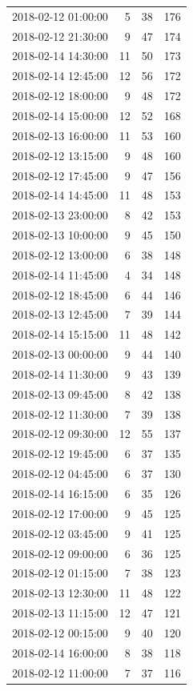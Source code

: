 \begin{tabular}{lrrr}
2018-02-12 01:00:00 & 5 & 38 & 176 \\
2018-02-12 21:30:00 & 9 & 47 & 174 \\
2018-02-14 14:30:00 & 11 & 50 & 173 \\
2018-02-14 12:45:00 & 12 & 56 & 172 \\
2018-02-12 18:00:00 & 9 & 48 & 172 \\
2018-02-14 15:00:00 & 12 & 52 & 168 \\
2018-02-13 16:00:00 & 11 & 53 & 160 \\
2018-02-12 13:15:00 & 9 & 48 & 160 \\
2018-02-12 17:45:00 & 9 & 47 & 156 \\
2018-02-14 14:45:00 & 11 & 48 & 153 \\
2018-02-13 23:00:00 & 8 & 42 & 153 \\
2018-02-13 10:00:00 & 9 & 45 & 150 \\
2018-02-12 13:00:00 & 6 & 38 & 148 \\
2018-02-14 11:45:00 & 4 & 34 & 148 \\
2018-02-12 18:45:00 & 6 & 44 & 146 \\
2018-02-13 12:45:00 & 7 & 39 & 144 \\
2018-02-14 15:15:00 & 11 & 48 & 142 \\
2018-02-13 00:00:00 & 9 & 44 & 140 \\
2018-02-14 11:30:00 & 9 & 43 & 139 \\
2018-02-13 09:45:00 & 8 & 42 & 138 \\
2018-02-12 11:30:00 & 7 & 39 & 138 \\
2018-02-12 09:30:00 & 12 & 55 & 137 \\
2018-02-12 19:45:00 & 6 & 37 & 135 \\
2018-02-12 04:45:00 & 6 & 37 & 130 \\
2018-02-14 16:15:00 & 6 & 35 & 126 \\
2018-02-12 17:00:00 & 9 & 45 & 125 \\
2018-02-12 03:45:00 & 9 & 41 & 125 \\
2018-02-12 09:00:00 & 6 & 36 & 125 \\
2018-02-12 01:15:00 & 7 & 38 & 123 \\
2018-02-13 12:30:00 & 11 & 48 & 122 \\
2018-02-13 11:15:00 & 12 & 47 & 121 \\
2018-02-12 00:15:00 & 9 & 40 & 120 \\
2018-02-14 16:00:00 & 8 & 38 & 118 \\
2018-02-12 11:00:00 & 7 & 37 & 116 \\

\end{tabular}
